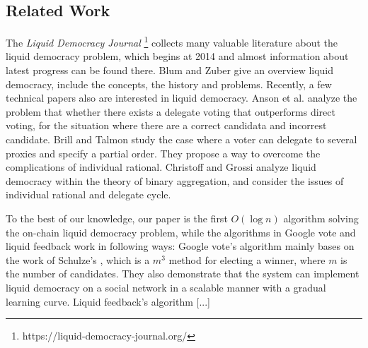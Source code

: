 \subsection{Related Work}
The {\em Liquid Democracy Journal} \footnote{https://liquid-democracy-journal.org/} collects many valuable literature about the liquid democracy problem, which begins at 2014 and almost information about latest progress can be found there. Blum and Zuber\cite{blum2016liquid} give an overview liquid democracy, include the concepts, the history and problems. Recently, a few technical papers also are interested in liquid democracy. Anson et al. \cite{kahng2018liquid} analyze the problem that whether there exists a delegate voting that outperforms direct voting, for the situation where there are a correct candidata and incorrest candidate. Brill and Talmon \cite{brill2018pairwise} study the case where a voter can delegate to several proxies and specify a partial order. They propose a way to overcome the complications of individual rational. Christoff and Grossi \cite{christoff2017binary} analyze liquid democracy within the theory of binary aggregation, and consider the issues of individual rational and delegate cycle. 

To the best of our knowledge, our paper is the first $O(\log n)$ algorithm solving the on-chain liquid democracy problem, while the algorithms in Google vote and liquid feedback work in following ways: Google vote's algorithm mainly bases on the work of Schulze's \cite{schulze2011new}, which is a $m^3$ method for electing a winner, where $m$ is the number of candidates. They also demonstrate that the system can implement liquid democracy on a social network in a scalable manner with a gradual learning curve. 
Liquid feedback's algorithm [...]   